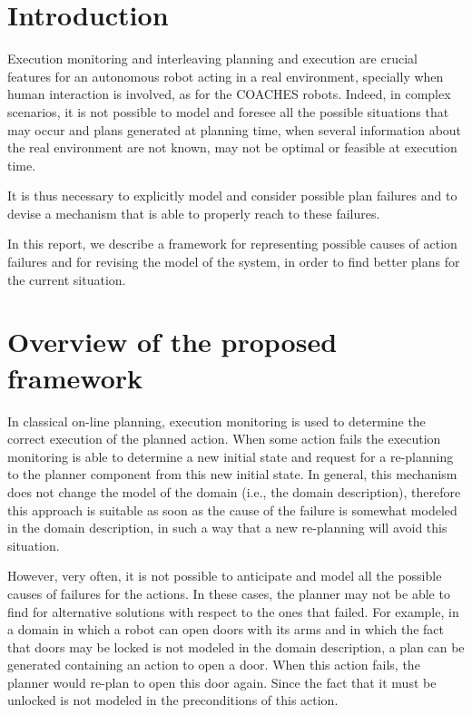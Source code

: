\section{Introduction}

Execution monitoring and interleaving planning and execution are crucial features for an autonomous robot acting in a real environment, specially when human interaction is involved, 
as for the COACHES robots. Indeed, in complex scenarios, it is not possible to model and foresee all the possible situations that may occur and plans generated at planning time, when several information about the real environment are not known, may not be optimal or feasible at execution time.

It is thus necessary to explicitly model and consider possible plan failures and to devise a mechanism that is able to properly reach to these failures.

In this report, we describe a framework for representing possible causes of action failures and for revising the model of the system, in order to find better plans for the current situation.

\section{Overview of the proposed framework}

In classical on-line planning, execution monitoring is used to determine the correct execution of the planned action. When some action fails the execution monitoring is able to determine a new initial state and request for a re-planning to the planner component from this new initial state.
In general, this mechanism does not change the model of the domain (i.e., the domain description), therefore this approach is suitable as soon as the cause of the failure is somewhat modeled in the domain description, in such a way that a new re-planning will avoid this situation.

However, very often, it is not possible to anticipate and model all the possible causes of failures for the actions. In these cases, the planner may not be able to find for alternative solutions with respect to the ones that failed. For example, in a domain in which a robot can open doors with its arms and in which the fact that doors may be locked is not modeled in the domain description, a plan can be generated containing an action to open a door. When this action fails, the planner would re-plan to open this door again. Since the fact that it must be unlocked is not modeled in the preconditions of this action.



